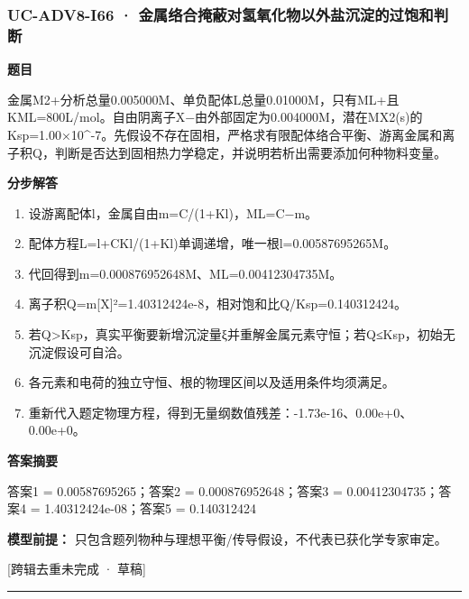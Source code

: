 \documentclass[UTF8,11pt,a4paper]{ctexart}
\begin{document}
\subsubsection*{UC-ADV8-I66 · 金属络合掩蔽对氢氧化物以外盐沉淀的过饱和判断}
\noindent\textbf{题目}\par
金属M2+分析总量0.005000M、单负配体L总量0.01000M，只有ML+且KML=800L/mol。自由阴离子X−由外部固定为0.004000M，潜在MX2(s)的Ksp=1.00×10\textasciicircum{}-7。先假设不存在固相，严格求有限配体络合平衡、游离金属和离子积Q，判断是否达到固相热力学稳定，并说明若析出需要添加何种物料变量。\par
\medskip\noindent\textbf{分步解答}
\begin{enumerate}
\item 设游离配体l，金属自由m=C/(1+Kl)，ML=C−m。
\item 配体方程L=l+CKl/(1+Kl)单调递增，唯一根l=0.00587695265M。
\item 代回得到m=0.000876952648M、ML=0.00412304735M。
\item 离子积Q=m[X]²=1.40312424e-8，相对饱和比Q/Ksp=0.140312424。
\item 若Q>Ksp，真实平衡要新增沉淀量ξ并重解金属元素守恒；若Q≤Ksp，初始无沉淀假设可自洽。
\item 各元素和电荷的独立守恒、根的物理区间以及适用条件均须满足。
\item 重新代入题定物理方程，得到无量纲数值残差：-1.73e-16、0.00e+0、0.00e+0。
\end{enumerate}
\noindent\textbf{答案摘要}\par
答案1 = 0.00587695265；答案2 = 0.000876952648；答案3 = 0.00412304735；答案4 = 1.40312424e-08；答案5 = 0.140312424\par
\noindent\textbf{模型前提：}
只包含题列物种与理想平衡/传导假设，不代表已获化学专家审定。\par
\noindent\textcolor{red!65!black}{[跨辑去重未完成 · 草稿]} \par
\medskip\hrule\medskip
{}
\end{document}
